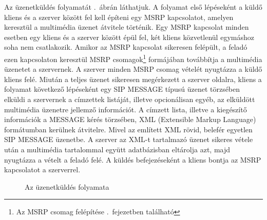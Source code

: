 Az üzenetküldés folyamatát .~ábrán láthatjuk. A folyamat első lépéseként a küldő kliens és a szerver között fel kell építeni egy MSRP kapcsolatot, amelyen keresztül a multimédia üzenet átvitele történik. Egy MSRP kapcsolat minden esetben egy kliens és a szerver között épül fel, két kliens közvetlenül egymáshoz soha nem csatlakozik. Amikor az MSRP kapcsolat sikeresen felépült, a feladó ezen kapcsolaton keresztül MSRP csomagok\footnote{Az MSRP csomag felépítése .~fejezetben található} formájában továbbítja a multimédia üzenetet a szervernek. A szerver minden MSRP csomag vételét nyugtázza a küldő kliens felé. Miután a teljes üzenet sikeresen megérkezett a szerver oldalra, kliens a folyamat következő lépéseként egy SIP MESSAGE típusú üzenet törzsében elküldi a szervernek a címzettek listáját, illetve opcionálisan egyéb, az elküldött multimédia üzenetre jellemző információt. A címzett lista, illetve a kiegészítő információk a MESSAGE kérés törzsében, XML (Extensible Markup Language) formátumban kerülnek átvitelre. Mivel az említett XML rövid, belefér egyetlen SIP MESSAGE üzenetbe. A szerver az XML-t tartalmazó üzenet sikeres vétele után a multimédia tartalommal együtt adatbázisban eltárolja azt, majd nyugtázza a vételt a feladó felé. A küldés befejezéseként a kliens bontja az MSRP kapcsolatot a szerverrel.

\begin{figure}[htbp]
\center
{}
\caption{Az üzenetküldés folyamata}
\label{fig:sending_proc}
\end{figure}

